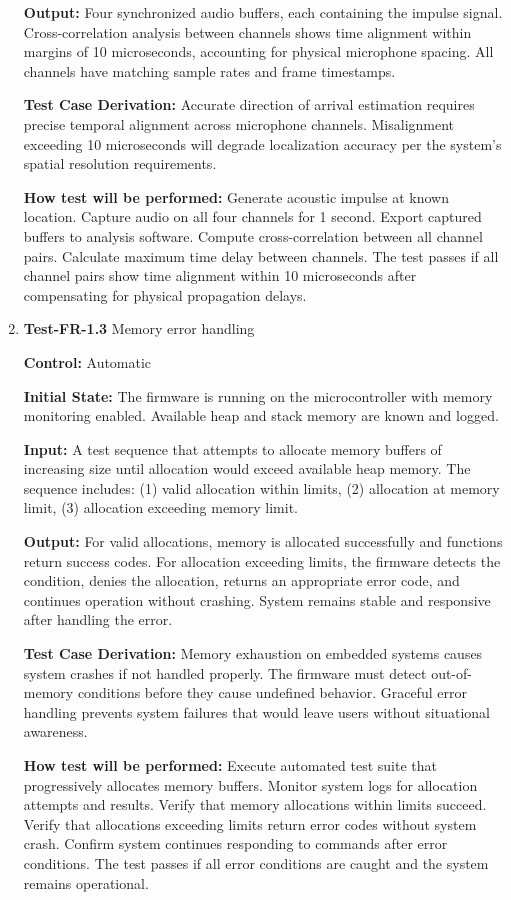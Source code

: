 \documentclass[12pt, titlepage]{article}
\begin{document}
\begin{enumerate}
\textbf{Output:}
Four synchronized audio buffers, each containing the impulse signal.
Cross-correlation analysis between channels shows time alignment within margins
of 10 microseconds, accounting for physical microphone spacing. All channels
have matching sample rates and frame timestamps.

\textbf{Test Case Derivation:} 
Accurate direction of arrival estimation requires precise temporal alignment
across microphone channels. Misalignment exceeding 10 microseconds will degrade
localization accuracy per the system's spatial resolution requirements.
					
\textbf{How test will be performed:}
Generate acoustic impulse at known location. Capture audio on all four channels
for 1 second. Export captured buffers to analysis software. Compute
cross-correlation between all channel pairs. Calculate maximum time delay
between channels. The test passes if all channel pairs show time alignment
within 10 microseconds after compensating for physical propagation delays.

\item{\textbf{Test-FR-1.3} Memory error handling\\}

\textbf{Control:} Automatic
					
\textbf{Initial State:} 
The firmware is running on the microcontroller with memory monitoring enabled.
Available heap and stack memory are known and logged.
					
\textbf{Input:}
A test sequence that attempts to allocate memory buffers of increasing size
until allocation would exceed available heap memory. The sequence includes: (1)
valid allocation within limits, (2) allocation at memory limit, (3) allocation
exceeding memory limit.
					
\textbf{Output:}
For valid allocations, memory is allocated successfully and functions return
success codes. For allocation exceeding limits, the firmware detects the
condition, denies the allocation, returns an appropriate error code, and
continues operation without crashing. System remains stable and responsive after
handling the error.

\textbf{Test Case Derivation:} 
Memory exhaustion on embedded systems causes system crashes if not handled
properly. The firmware must detect out-of-memory conditions before they cause
undefined behavior. Graceful error handling prevents system failures that would
leave users without situational awareness.
					
\textbf{How test will be performed:}
Execute automated test suite that progressively allocates memory buffers.
Monitor system logs for allocation attempts and results. Verify that memory
allocations within limits succeed. Verify that allocations exceeding limits
return error codes without system crash. Confirm system continues responding to
commands after error conditions. The test passes if all error conditions are
caught and the system remains operational.


\end{enumerate}
\end{document}
